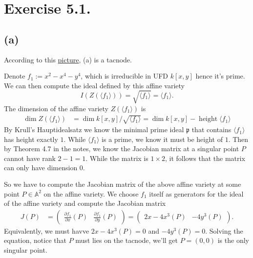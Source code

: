 \section{Exercise 5.1.}

\subsection{(a)}

According to this \href{https://www.desmos.com/calculator/08sanf19br}{picture}, (a) is a tacnode. 

Denote $f_1:=x^2-x^4-y^4$, which is irreducible in UFD $k[x,y]$ hence it's prime. We can then compute the ideal defined by this affine variety 
\[I(Z(\langle f_1\rangle))=\sqrt{\langle f_1\rangle}=\langle f_1\rangle.\]
The dimension of the affine variety $Z(\langle f_1\rangle)$ is 
\begin{align*}
    \operatorname{dim} Z(\langle f_1\rangle) &= \operatorname{dim} k[x,y]/\sqrt{\langle f_1\rangle}=\operatorname{dim} k[x,y]-\operatorname{height} \langle f_1\rangle
\end{align*}
By Krull's Hauptidealsatz we know the minimal prime ideal $\mathfrak p$ that contains $\langle f_1\rangle$ has height exactly $1$. While $\langle f_1\rangle$ is a prime, we know it must be height of $1$. Then by Theorem 4.7 in the notes, we know the Jacobian matrix at a singular point $P$ cannot have rank $2-1=1$. While the matrix is $1\times 2$, it follows that the matrix can only have dimension $0$.

So we have to compute the Jacobian matrix of the above affine variety at some point $P\in \mathbb A^2$ on the affine variety. We choose $f_1$ itself as generators for the ideal of the affine variety and compute the Jacobian matrix
\begin{align*}
    J(P) &= \begin{pmatrix}
        \frac{\partial f_1}{\partial x}(P) & \frac{\partial f_1}{\partial y}(P)
    \end{pmatrix}=
            \begin{pmatrix}
                2x-4x^3 (P) & -4y^3 (P)
            \end{pmatrix}.
\end{align*}
Equivalently, we must havve $2x-4x^3 (P)=0$ and $-4y^3 (P)=0$.
Solving the equation, notice that $P$ must lies on the tacnode, we'll get $P=(0,0)$ is the only singular point.

